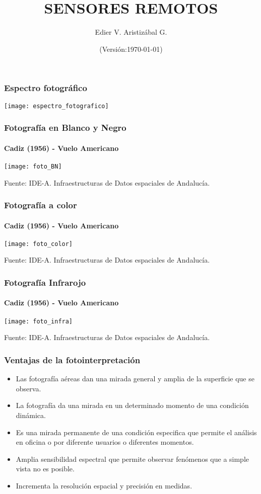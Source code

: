 \documentclass[14pt]{beamer}
\title[Introducción a la fotografía aérea]{SENSORES REMOTOS}
\author[Edier Aristizábal]{Edier V. Aristizábal G.}
\institute{\emph{evaristizabalg@unal.edu.co}}
\date{\tiny{(Versión:\today)}}
\begin{document}
\begin{frame}
\frametitle{Espectro fotográfico}
\centering
\texttt{[image: espectro\_fotografico]}
\end{frame}
\begin{frame}
\frametitle{Fotografía en Blanco y Negro}
\framesubtitle{Cadiz (1956)  - Vuelo Americano}
\begin{center}
\texttt{[image: foto\_BN]}
\end{center}
\tiny{Fuente: IDE-A. Infraestructuras de Datos espaciales de Andalucía.}
\end{frame}
\begin{frame}
\frametitle{Fotografía a color}
\framesubtitle{Cadiz (1956)  - Vuelo Americano}
\begin{center}
\texttt{[image: foto\_color]}
\end{center}
\tiny{Fuente: IDE-A. Infraestructuras de Datos espaciales de Andalucía.}
\end{frame}
\begin{frame}
\frametitle{Fotografía Infrarojo}
\framesubtitle{Cadiz (1956)  - Vuelo Americano}
\begin{center}
\texttt{[image: foto\_infra]}
\end{center}
\tiny{Fuente: IDE-A. Infraestructuras de Datos espaciales de Andalucía.}
\end{frame}
\begin{frame}
\frametitle{Ventajas de la fotointerpretación}
\small{
\begin{itemize}
\item Las fotografía aéreas dan una mirada general y amplia de la superficie que se observa.
\item La fotografía da una mirada en un determinado momento de una condición dinámica.\\
\item Es una mirada permanente de una condición especifica que permite el análisis en oficina o por diferente usuarios o diferentes momentos.\\
\item Amplia sensibilidad espectral que permite observar fenómenos que a simple vista no es posible.\\
\item Incrementa la resolución espacial y  precisión en medidas.
\end{itemize}
}
\end{frame}
\end{document}
